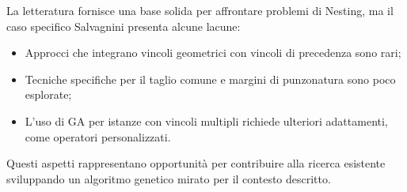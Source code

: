 La letteratura fornisce una base solida per affrontare problemi di Nesting, ma il caso specifico Salvagnini presenta alcune lacune:

\begin{itemize}
    \item Approcci che integrano vincoli geometrici con vincoli di precedenza sono rari;
    \item Tecniche specifiche per il taglio comune e margini di punzonatura sono poco esplorate;
    \item L'uso di GA per istanze con vincoli multipli richiede ulteriori adattamenti, come operatori personalizzati.
\end{itemize}

Questi aspetti rappresentano opportunità per contribuire alla ricerca esistente sviluppando un algoritmo genetico mirato per il contesto descritto.